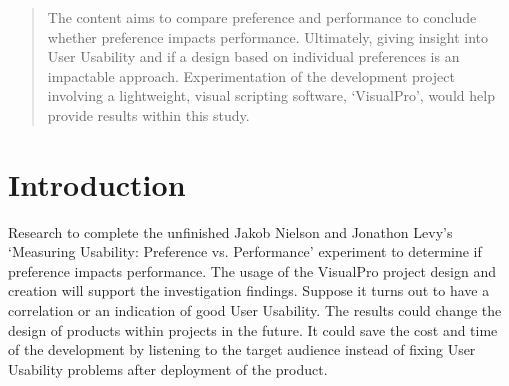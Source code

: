 \documentclass[a0,portrait]{a0poster}
\begin{document}
\begin{multicols}{2} %


\color{ku} %

\begin{abstract}
    The content aims to compare preference and performance to conclude whether preference impacts performance. Ultimately, giving insight into User Usability and if a design based on individual preferences is an impactable approach. Experimentation of the development project involving a lightweight, visual scripting software, `VisualPro', would help provide results within this study.
\end{abstract}


\color{DarkRed} %

\section*{Introduction}
    Research to complete the unfinished Jakob Nielson and Jonathon Levy's `Measuring Usability: Preference vs. Performance' experiment to determine if preference impacts performance. The usage of the VisualPro project design and creation will support the investigation findings. Suppose it turns out to have a correlation or an indication of good User Usability. The results could change the design of products within projects in the future. It could save the cost and time of the development by listening to the target audience instead of fixing User Usability problems after deployment of the product.


\end{multicols}
\end{document}
